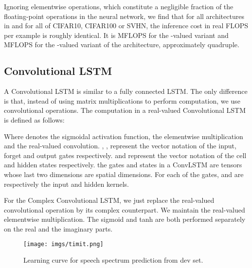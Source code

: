 \documentclass{article}
\begin{document}
Ignoring elementwise operations, which constitute a negligible fraction of the floating-point operations in the neural network, we find that for all architectures in \label{results_activation} and for all of CIFAR10, CIFAR100 or SVHN, the inference cost in real FLOPS per example is roughly identical. It is  MFLOPS for the -valued variant and  MFLOPS for the -valued variant of the architecture, approximately quadruple.




\subsection{Convolutional LSTM}\label{convlstm}
A Convolutional LSTM is similar to a fully connected LSTM. The only difference is that, instead of using matrix multiplications to perform computation, we use convolutional operations. The computation in a real-valued Convolutional LSTM is defined as follows: 

Where  denotes the sigmoidal activation function,  the elementwise multiplication and  the real-valued convolution. , ,  represent the vector notation of the input, forget and output gates respectively.  and  represent the vector notation of the cell and hidden states respectively. the gates and states in a ConvLSTM are tensors whose last two dimensions are spatial dimensions. For each of the gates,  and  are respectively the input and hidden kernels.

For the Complex Convolutional LSTM, we just replace the real-valued convolutional operation by its complex counterpart. We maintain the real-valued elementwise multiplication. The sigmoid and tanh are both performed separately on the real and the imaginary parts.

\begin{figure}[h]
\centering
  \texttt{[image: imgs/timit.png]}
  \caption{Learning curve for speech spectrum prediction from dev set.}
  \label{fig:timit_learning}
\end{figure}

\newpage
\end{document}

